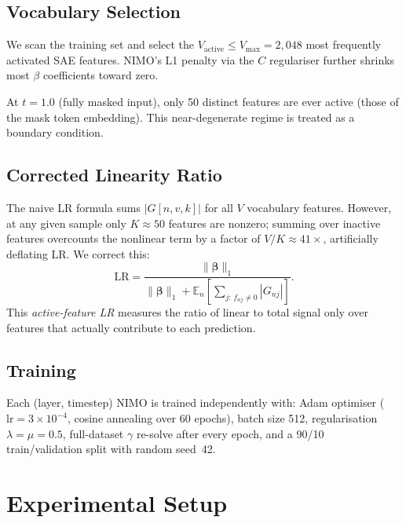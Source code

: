 \documentclass[11pt]{article}
\newcommand{\LR}{\mathrm{LR}}
\newcommand{\bfbeta}{\boldsymbol{\beta}}
\begin{document}
\subsection{Vocabulary Selection}

We scan the training set and select the $V_\mathrm{active} \le V_\mathrm{max} = 2{,}048$ most frequently activated SAE features. NIMO's L1 penalty via the $C$ regulariser further shrinks most $\beta$ coefficients toward zero.

At $t = 1.0$ (fully masked input), only 50 distinct features are ever active (those of the mask token embedding). This near-degenerate regime is treated as a boundary condition.

\subsection{Corrected Linearity Ratio}
\label{sec:lr}

The naive LR formula sums $|G[n, v, k]|$ for all $V$ vocabulary features. However, at any given sample only $K \approx 50$ features are nonzero; summing over inactive features overcounts the nonlinear term by a factor of $V/K \approx 41\times$, artificially deflating LR. We correct this:
\begin{equation}
    \LR = \frac{\|\bfbeta\|_1}{\|\bfbeta\|_1 + \mathbb{E}_n\!\left[\displaystyle\sum_{j:\,f_{nj} \neq 0} |G_{nj}|\right]}.
    \label{eq:lr_corrected}
\end{equation}
This \emph{active-feature LR} measures the ratio of linear to total signal only over features that actually contribute to each prediction.

\subsection{Training}

Each (layer, timestep) NIMO is trained independently with:
Adam optimiser ($\mathrm{lr} = 3\times10^{-4}$, cosine annealing over 60 epochs), batch size 512, regularisation $\lambda = \mu = 0.5$, full-dataset $\gamma$ re-solve after every epoch, and a 90/10 train/validation split with random seed~42.

\section{Experimental Setup}
\end{document}
